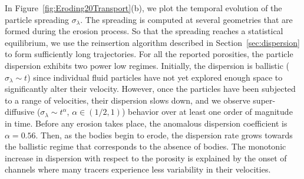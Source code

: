\documentclass[preprint, 10pt]{elsarticle}
\begin{document}
In Figure~\ref{fig:Eroding20Transport}(b), we plot the temporal
evolution of the particle spreading $\sigma_\lambda$.  The spreading is
computed at several geometries that are formed during the erosion
process.  So that the spreading reaches a statistical equilibrium, we
use the reinsertion algorithm described in Section~\ref{sec:dispersion}
to form sufficiently long trajectories.  For all the reported
porosities, the particle dispersion exhibits two power low regimes.
Initially, the dispersion is ballistic ($\sigma_\lambda \sim t$) since
individual fluid particles have not yet explored enough space to
significantly alter their velocity.  However, once the particles have
been subjected to a range of velocities, their dispersion slows down,
and we observe super-diffusive ($\sigma_\lambda \sim t^\alpha$, $\alpha
\in (1/2,1)$) behavior over at least one order of magnitude in time.
Before any erosion takes place, the anomalous dispersion coefficient is
$\alpha = 0.56$.  Then, as the bodies begin to erode, the dispersion
rate grows towards the ballistic regime that corresponds to the absence
of bodies.  The monotonic increase in dispersion with respect to the
porosity is explained by the onset of channels where many tracers
experience less variability in their velocities.
\end{document}
